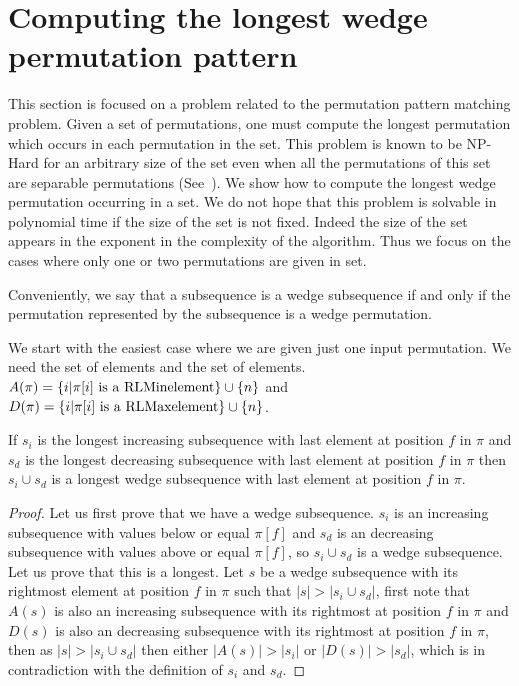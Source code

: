 \documentclass[a4paper]{llncs}
\newcommand{\RLMin}{\text{RLMin}}
\newcommand{\RLMax}{\text{RLMax}}
\begin{document}

\section{Computing the longest wedge permutation pattern}
\label{section:LCS}

This section is focused on a problem related to the permutation pattern matching problem.
Given a set of permutations, one must compute the longest permutation
which occurs in each permutation in the set.
This problem is known to be NP-Hard for an arbitrary size of the set even
when all the permutations of this set are separable permutations (See~\cite{2007math......2109B}).
We show how to compute the longest wedge permutation
occurring in a set.
We do not hope that this problem is solvable in polynomial time
if the size of the set is not fixed.
Indeed the size of the set appears in the exponent
in the complexity of the algorithm.
Thus we focus on the cases where only one or two permutations are given in set.

Conveniently, we say that a subsequence is
a wedge subsequence if and only if the permutation represented by the subsequence
is a wedge permutation.

We start with the easiest case where we are given just one input permutation.
We need the set of \RLMax elements and the set of \RLMin elements.
$A(\pi) = \{i | \text{$\pi[i]$ is a \RLMin element} \} \cup \{n\}$ and
$D(\pi) = \{i | \text{$\pi[i]$ is a \RLMax element} \} \cup \{n\}$.\\


\begin{proposition}
\label{proposition:longestIncreasingSubsequence}
If $s_i$ is the longest increasing subsequence with last element at position $f$ in $\pi$
and $s_d$ is the longest decreasing subsequence with last element at position $f$ in $\pi$
then $s_i \cup s_d$ is a longest wedge subsequence with last element at position $f$ in $\pi$.
\end{proposition}

\begin{proof}
Let us first prove that we have a wedge subsequence.
$s_i$ is an increasing subsequence with values below or equal $\pi[f]$ and
$s_d$ is an decreasing subsequence with values above or equal $\pi[f]$,
so $s_i \cup s_d$ is a wedge subsequence.
Let us prove that this is a longest.
Let $s$ be a wedge subsequence with its rightmost element at position $f$ in $\pi$ such
that $|s|>|s_i \cup s_d|$,
first note that $A(s)$ is also an increasing subsequence with its rightmost  at position $f$ in $\pi$
and $D(s)$ is also an decreasing subsequence with its rightmost  at position $f$ in $\pi$,
then as $|s|>|s_i \cup s_d|$ then either $|A(s)| > |s_i|$ or $|D(s)| > |s_d|$,
which is in contradiction with the definition of $s_i$ and $s_d$.
\end{proof}
\end{document}
